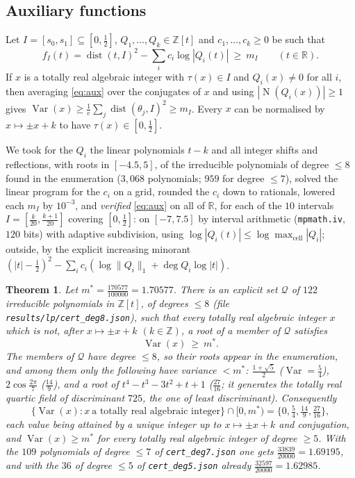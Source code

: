 \documentclass[11pt,reqno]{amsart}
\theoremstyle{plain}
\newtheorem{theorem}{Theorem}[section]
\theoremstyle{definition}
\newcommand{\Z}{\mathbb{Z}}
\newcommand{\R}{\mathbb{R}}
\DeclareMathOperator{\Var}{Var}
\DeclareMathOperator{\Nm}{N}
\DeclareMathOperator{\dist}{dist}
\begin{document}
\subsection{Auxiliary functions}
Let $I=[s_0,s_1]\subseteq[0,\frac12]$, $Q_1,\dots,Q_k\in\Z[t]$ and $c_1,\dots,c_k\ge0$ be such that
\begin{equation}\label{eq:aux}
 f_I(t)=\dist(t,I)^{2}-\sum_ic_i\log|Q_i(t)|\ \ge\ m_I\qquad(t\in\R).
\end{equation}
If $x$ is a totally real algebraic integer with $\tau(x)\in I$ and $Q_i(x)\ne0$ for all $i$, then
averaging \eqref{eq:aux} over the conjugates of $x$ and using $|\Nm(Q_i(x))|\ge1$ gives
$\Var(x)\ge\frac1e\sum_j\dist(\theta_j,I)^{2}\ge m_I$. Every $x$ can be normalised by $x\mapsto\pm x+k$
to have $\tau(x)\in[0,\frac12]$.

We took for the $Q_i$ the linear polynomials $t-k$ and all integer shifts and reflections, with
roots in $[-4.5,5]$, of the irreducible polynomials of degree $\le8$ found in the enumeration
($3{,}068$ polynomials; $959$ for degree $\le7$), solved the linear program for the $c_i$ on a grid,
rounded the $c_i$ down to rationals, lowered each $m_I$ by $10^{-3}$, and \emph{verified} \eqref{eq:aux} on all of
$\R$, for each of the $10$ intervals $I=[\frac{k}{20},\frac{k+1}{20}]$ covering $[0,\frac12]$: on $[-7,7.5]$ by interval arithmetic
(\texttt{mpmath.iv}, $120$ bits) with adaptive subdivision, using
$\log|Q_i(t)|\le\log\max_{\text{cell}}|Q_i|$; outside, by the explicit increasing minorant
$(|t|-\frac12)^{2}-\sum_ic_i(\log\|Q_i\|_1+\deg Q_i\log|t|)$.

\begin{theorem}\label{thm:lp}
Let $m^{*}=\frac{170577}{100000}=1.70577$. There is an explicit set $\mathcal Q$ of $122$
irreducible polynomials in $\Z[t]$, of degrees $\le8$ (file \texttt{results/lp/cert\_deg8.json}), such
that every
totally real algebraic integer $x$ which is not, after $x\mapsto\pm x+k$ $(k\in\Z)$, a root of a
member of $\mathcal Q$ satisfies
\[
 \Var(x)\ \ge\ m^{*}.
\]
The members of $\mathcal Q$ have degree $\le8$, so their roots appear in the enumeration, and among
them only the following have variance $<m^{*}$: $\frac{1+\sqrt5}2$ ($\Var=\frac54$),
$2\cos\frac{2\pi}7$ ($\frac{14}9$), and a root of $t^{4}-t^{3}-3t^{2}+t+1$ ($\frac{27}{16}$; it generates
the totally real quartic field of discriminant $725$, the one of least discriminant). Consequently
\[
 \{\Var(x):x\ \text{a totally real algebraic integer}\}\cap[0,m^{*})=\{0,\tfrac54,\tfrac{14}9,\tfrac{27}{16}\},
\]
each value being attained by a unique integer up to $x\mapsto\pm x+k$ and conjugation, and
$\Var(x)\ge m^{*}$ for every totally real algebraic integer of degree $\ge5$. With the $109$
polynomials of degree $\le7$ of \texttt{cert\_deg7.json} one gets $\frac{33839}{20000}=1.69195$, and
with the $36$ of degree $\le5$ of \texttt{cert\_deg5.json} already $\frac{32597}{20000}=1.62985$.
\end{theorem}
\end{document}
